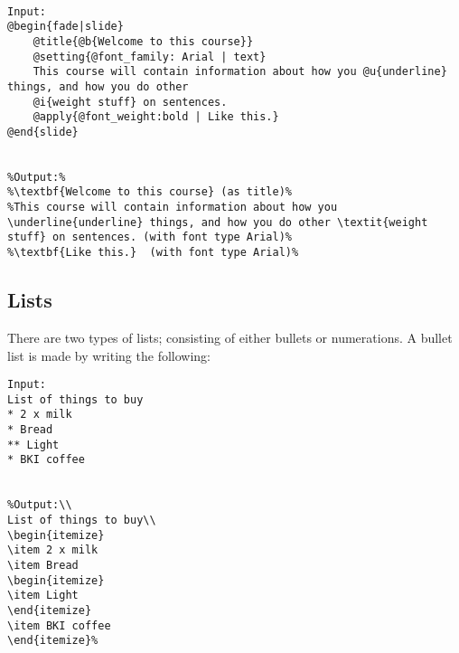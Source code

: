  \\

\begin{lstlisting}[frame=single]
Input:
@begin{fade|slide}
    @title{@b{Welcome to this course}}
    @setting{@font_family: Arial | text}
    This course will contain information about how you @u{underline} things, and how you do other    
    @i{weight stuff} on sentences.
    @apply{@font_weight:bold | Like this.}
@end{slide}


%Output:%
%\textbf{Welcome to this course} (as title)%
%This course will contain information about how you \underline{underline} things, and how you do other \textit{weight stuff} on sentences. (with font type Arial)%
%\textbf{Like this.}  (with font type Arial)%
\end{lstlisting}


\subsection{Lists}
There are two types of lists; consisting of either bullets or numerations.
A bullet list is made by writing the following: \\

\begin{lstlisting}[frame=single]
Input:
List of things to buy
* 2 x milk
* Bread
** Light
* BKI coffee

 
%Output:\\
List of things to buy\\
\begin{itemize}
\item 2 x milk
\item Bread
\begin{itemize}
\item Light
\end{itemize}
\item BKI coffee
\end{itemize}%
\end{lstlisting}

 \\

